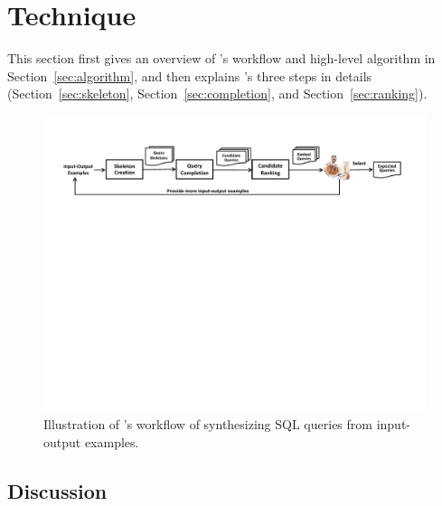 
\section{Technique}
\label{sec:approach}

This section first gives an overview of \ourtool's
workflow and high-level algorithm in Section~\ref{sec:algorithm}, and
then explains \ourtool's three steps in details (Section~\ref{sec:skeleton},
Section~\ref{sec:completion}, and Section~\ref{sec:ranking}).



\begin{figure}[t]
  \centering
  \includegraphics[scale=0.70]{workflow}
  \vspace*{-2.0ex}\caption {{\label{fig:workflow} Illustration
  of \ourtool's workflow of synthesizing SQL queries from input-output examples. 
}}

\end{figure}

\vspace{-1mm}



\vspace{-1mm}




\vspace{-1mm}


\vspace{-1mm}



\vspace{-1mm}
\subsection{Discussion}
\label{sec:uim}

